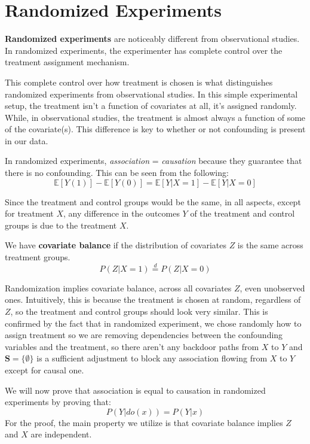 \chapter{Randomized Experiments}
\textbf{Randomized experiments} are noticeably different from observational studies.
In randomized experiments, the experimenter has complete control over the treatment
assignment mechanism.

This complete control over how treatment is chosen is what distinguishes randomized
experiments from observational studies. In this simple experimental setup, the
treatment isn't a function of covariates at all, it's assigned randomly. While,
in observational studies, the treatment is almost always a function of some of
the covariate(s). This difference is key to whether or not confounding is present
in our data.

In randomized experiments, \textit{association} = \textit{causation} because they
guarantee that there is no confounding. This can be seen from the following:
\begin{equation}
    \mathbb{E}[Y(1)] -  \mathbb{E}[Y(0)] = \mathbb{E}[Y| X = 1] - \mathbb{E}[Y | X = 0]
\end{equation}

Since the treatment and control groups would be the same, in all aspects, except
for treatment $X$, any difference in the outcomes $Y$ of the treatment and control
groups is due to the treatment $X$.
\begin{definition}
    We have \textbf{covariate balance} if the distribution of covariates $Z$ is
    the same across treatment groups.
    \begin{equation}
        P(Z|X = 1) \stackrel{d}{=} P(Z|X = 0)
    \end{equation}
\end{definition}

Randomization implies covariate balance, across all covariates $Z$, even unobserved
ones. Intuitively, this is because the treatment is chosen at random, regardless
of $Z$, so the treatment and control groups should look very similar. This is
confirmed by the fact that in randomized experiment, we chose randomly how to assign
treatment so we are removing dependencies between the confounding variables
and the treatment, so there aren't any backdoor paths from $X$ to $Y$ and $\mathbf{S} =\{\emptyset\}$
is a sufficient adjustment to block any association flowing from $X$ to $Y$ except
for causal one.

We will now prove that association is equal to causation in randomized experiments
by proving that:
\begin{equation*}
    P(Y|do(x)) = P(Y|x)
\end{equation*}
For the proof, the main property we utilize is that covariate balance implies
$Z$ and $X$ are independent.

